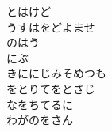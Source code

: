 \documentclass[10pt,b5j]{tarticle} %
\begin{document}
\begin{enumerate}
\begin{minipage}[c]{\blocksize}
        \vspace{\linespace}
        \item
        とはけど\\
        うすはをどよませ\\
        のはう\\
        にぶ\\
        きににじみそめつも\\
        をとりてをとさじ\\
        なをちてるに\\
        わがのをさん
    
    \end{minipage}
\end{enumerate} %
\end{document}
